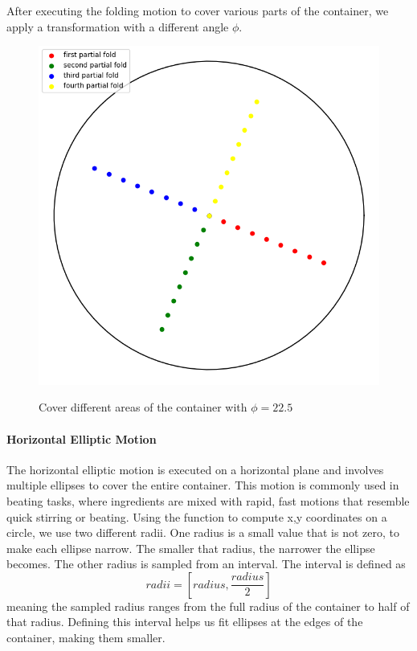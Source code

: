 After executing the folding motion to cover various parts of the container, we apply a transformation with a different angle $\phi$.

\begin{figure}[H]
    \includegraphics[scale=0.35]{Graphics/motions/folding1.png}
    \centering
    \label{fig:foldingMotion1}
    \caption{Cover different areas of the container with $\phi=22.5$}
\end{figure}

\paragraph{Horizontal Elliptic Motion}
The horizontal elliptic motion is executed on a horizontal plane and involves multiple ellipses to cover the entire container. 
This motion is commonly used in beating tasks, where ingredients are mixed with rapid, fast motions that resemble quick stirring or beating.
\newline
\newline
Using the function to compute x,y coordinates on a circle, we use two different radii.
One radius is a small value that is not zero, to make each ellipse narrow. The smaller that radius, the narrower the ellipse becomes. The other radius is sampled from an interval. 
The interval is defined as \[radii = [radius, \frac{radius} {2} ]\]
meaning the sampled radius ranges from the full radius of the container to half of that radius. 
Defining this interval helps us fit ellipses at the edges of the container, making them smaller.

